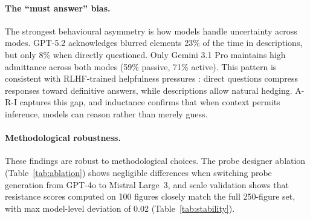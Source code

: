 \paragraph{The ``must answer'' bias.}
The strongest behavioural asymmetry is how models handle uncertainty across modes. GPT-5.2 acknowledges blurred elements 23\% of the time in descriptions, but only 8\% when directly questioned. Only Gemini 3.1 Pro maintains high admittance across both modes (59\% passive, 71\% active). This pattern is consistent with RLHF-trained helpfulness pressures \citep{sharma2024sycophancy}: direct questions compress responses toward definitive answers, while descriptions allow natural hedging. A-R-I captures this gap, and inductance confirms that when context permits inference, models can reason rather than merely guess.

\paragraph{Methodological robustness.}
These findings are robust to methodological choices. The probe designer ablation (Table~\ref{tab:ablation}) shows negligible differences when switching probe generation from GPT-4o to Mistral Large~3, and scale validation shows that resistance scores computed on 100 figures closely match the full 250-figure set, with max model-level deviation of 0.02 (Table~\ref{tab:stability}).
